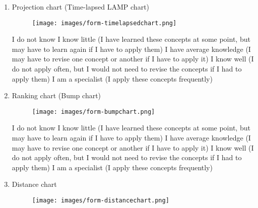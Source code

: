 \begin{enumerate}
\begin{enumerate}
   \item Projection chart (Time-lapsed LAMP chart)
   \begin{figure}[H]
		\centering
		\texttt{[image: images/form-timelapsedchart.png]}
		\label{fig:form-timelapsedchart}
	   \end{figure}

    I do not know
   \newline {} I know little (I have learned these concepts at some point, but may have to learn again if I have to apply them)
   \newline {} I have average knowledge (I may have to revise one concept or another if I have to apply it)
   \newline {} I know well (I do not apply often, but I would not need to revise the concepts if I had to apply them)
   \newline {} I am a specialist (I apply these concepts frequently)\\

 \newpage
       \item Ranking chart (Bump chart)
       \begin{figure}[H]
 		\centering
 		\texttt{[image: images/form-bumpchart.png]}
 		\label{fig:form-bumpchart}
 	   \end{figure}
       
        I do not know
       \newline {} I know little (I have learned these concepts at some point, but may have to learn again if I have to apply them)
       \newline {} I have average knowledge (I may have to revise one concept or another if I have to apply it)
       \newline {} I know well (I do not apply often, but I would not need to revise the concepts if I had to apply them)
       \newline {} I am a specialist (I apply these concepts frequently)\\

 \newpage
       \item Distance chart
       \begin{figure}[H]
 		\centering
 		\texttt{[image: images/form-distancechart.png]}
 		\label{fig:form-distancechart}
 	   \end{figure}
      

\end{enumerate}
\end{enumerate}
